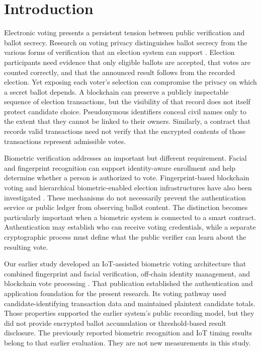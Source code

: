 \section{Introduction}

\label{sec:01}

\label{sec:introduction}

Electronic voting presents a persistent tension between public verification and ballot secrecy. Research on voting privacy distinguishes ballot secrecy from the various forms of verification that an election system can support \citep{jonker2013privacy}. Election participants need evidence that only eligible ballots are accepted, that votes are counted correctly, and that the announced result follows from the recorded election. Yet exposing each voter's selection can compromise the privacy on which a secret ballot depends. A blockchain can preserve a publicly inspectable sequence of election transactions, but the visibility of that record does not itself protect candidate choice. Pseudonymous identifiers conceal civil names only to the extent that they cannot be linked to their owners. Similarly, a contract that records valid transactions need not verify that the encrypted contents of those transactions represent admissible votes.

Biometric verification addresses an important but different requirement. Facial and fingerprint recognition can support identity-aware enrollment and help determine whether a person is authorized to vote. Fingerprint-based blockchain voting and hierarchical biometric-enabled election infrastructures have also been investigated \citep{ibrahim2021electionblock,indrason2025mbcsd}. These mechanisms do not necessarily prevent the authentication service or public ledger from observing ballot content. The distinction becomes particularly important when a biometric system is connected to a smart contract. Authentication may establish who can receive voting credentials, while a separate cryptographic process must define what the public verifier can learn about the resulting vote.

Our earlier study developed an IoT-assisted biometric voting architecture that combined fingerprint and facial verification, off-chain identity management, and blockchain vote processing \citep{rifat2026biometric}. That publication established the authentication and application foundation for the present research. Its voting pathway used candidate-identifying transaction data and maintained plaintext candidate totals. Those properties supported the earlier system's public recording model, but they did not provide encrypted ballot accumulation or threshold-based result disclosure. The previously reported biometric recognition and IoT timing results belong to that earlier evaluation. They are not new measurements in this study.

